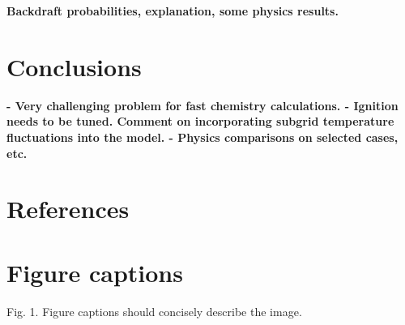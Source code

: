 \documentclass[12pt,letterpaper]{article}
\begin{document}
\begin{flushleft}
\textbf{Backdraft probabilities, explanation, some physics results.}


\section{Conclusions}

\textbf{- Very challenging problem for fast chemistry calculations. - Ignition needs to be tuned. Comment on incorporating subgrid temperature fluctuations into the model. - Physics comparisons on selected cases, etc.}

\section*{References}


	
%	
%	
%
%	
	
	
	
		
	
	

\newpage %
\section*{Figure captions}
Fig. 1. Figure captions should concisely describe the image.


\end{flushleft}
\end{document}
